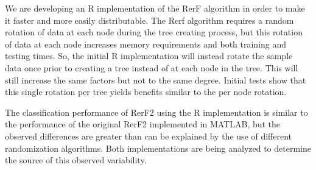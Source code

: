 \documentclass[simplex.tex]{subfiles}
\begin{document}
We are developing an R implementation of the RerF algorithm in order to make it
faster and more easily distributable.  The Rerf algorithm requires a random
rotation of data at each node during the tree creating process, but this
rotation of data at each node increases memory requirements and both training
and testing times.  So, the initial R implementation will instead rotate the
sample data once prior to creating a tree instead of at each node in the tree.
This will still increase the same factors but not to the same degree.  Initial
tests show that this single rotation per tree yields benefits similar to the
per node rotation.

The classification performance of RerF2 using the R implementation is similar
to the performance of the original RerF2 implemented in MATLAB, but the
observed differences are greater than can be explained by the use of different
randomization algorithms.  Both implementations are being analyzed to determine
the source of this observed variability.
\end{document}
